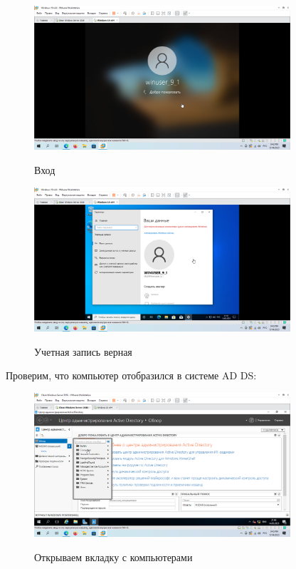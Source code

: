 \documentclass[a4paper]{article}
\begin{document}
  \begin{figure}[H]
    \centering
    \includegraphics[width=0.85\textwidth]{5_0095}
    \label{img:95}
    \caption{Вход}
  \end{figure}

  \begin{figure}[H]
    \centering
    \includegraphics[width=0.85\textwidth]{5_0096}
    \label{img:96}
    \caption{Учетная запись верная}
  \end{figure}

  Проверим, что компьютер отобразился в системе AD DS:

  \begin{figure}[H]
    \centering
    \includegraphics[width=0.85\textwidth]{5_0097}
    \label{img:97}
    \caption{Открываем вкладку с компьютерами}
  \end{figure}
\end{document}
